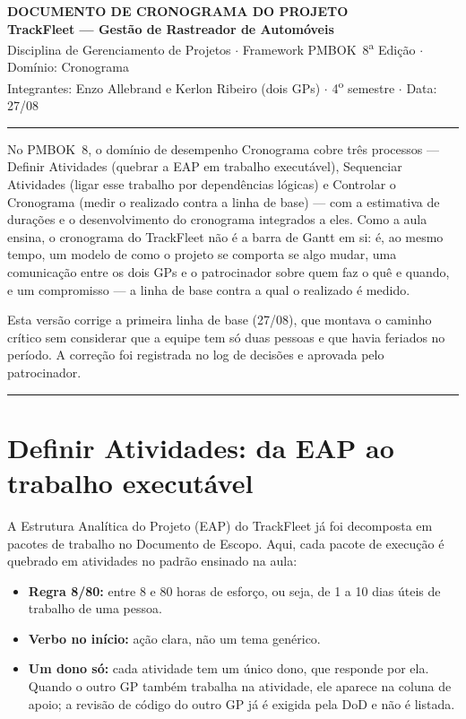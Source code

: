 \documentclass[11pt,a4paper]{article}
\newcommand{\cabecalho}[3]{%
  \begin{center}
  {\Large\bfseries DOCUMENTO DE #1 DO PROJETO}\\[2pt]
  {\large\bfseries TrackFleet --- Gestão de Rastreador de Automóveis}\\[4pt]
  Disciplina de Gerenciamento de Projetos $\cdot$ Framework PMBOK\textregistered\ 8\textsuperscript{a} Edição $\cdot$ Domínio: #2\\[2pt]
  Integrantes: Enzo Allebrand e Kerlon Ribeiro (dois GPs) $\cdot$ 4\textsuperscript{o} semestre $\cdot$ Data: #3
  \end{center}
  \vspace{2mm}\hrule\vspace{4mm}}
\newcommand{\separador}{\par\vspace{2mm}\hrule\vspace{4mm}}
\begin{document}
\cabecalho{CRONOGRAMA}{Cronograma}{27/08}

\noindent No PMBOK\textregistered\ 8, o domínio de desempenho Cronograma cobre três processos --- Definir Atividades (quebrar a EAP em trabalho executável), Sequenciar Atividades (ligar esse trabalho por dependências lógicas) e Controlar o Cronograma (medir o realizado contra a linha de base) --- com a estimativa de durações e o desenvolvimento do cronograma integrados a eles. Como a aula ensina, o cronograma do TrackFleet não é a barra de Gantt em si: é, ao mesmo tempo, um modelo de como o projeto se comporta se algo mudar, uma comunicação entre os dois GPs e o patrocinador sobre quem faz o quê e quando, e um compromisso --- a linha de base contra a qual o realizado é medido.

\noindent Esta versão corrige a primeira linha de base (27/08), que montava o caminho crítico sem considerar que a equipe tem só duas pessoas e que havia feriados no período. A correção foi registrada no log de decisões e aprovada pelo patrocinador.

\separador

\section{Definir Atividades: da EAP ao trabalho executável}\label{cro:atividades}

\noindent A Estrutura Analítica do Projeto (EAP) do TrackFleet já foi decomposta em pacotes de trabalho no Documento de Escopo. Aqui, cada pacote de execução é quebrado em atividades no padrão ensinado na aula:
\begin{itemize}[itemsep=2pt]
  \item \textbf{Regra 8/80:} entre 8 e 80 horas de esforço, ou seja, de 1 a 10 dias úteis de trabalho de uma pessoa.
  \item \textbf{Verbo no início:} ação clara, não um tema genérico.
  \item \textbf{Um dono só:} cada atividade tem um único dono, que responde por ela. Quando o outro GP também trabalha na atividade, ele aparece na coluna de apoio; a revisão de código do outro GP já é exigida pela DoD e não é listada.
\end{itemize}
\end{document}
